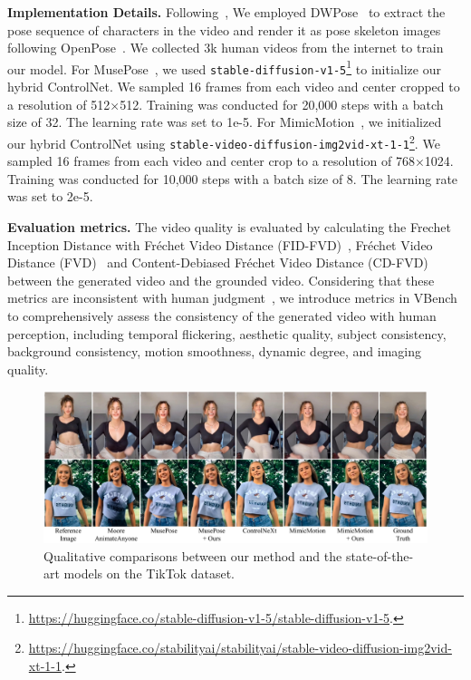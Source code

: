 \textbf{Implementation Details.} Following~\citep{hu2023animate,zhang2024mimicmotion}, We employed DWPose~\citep{yang2023dwpose} to extract the pose sequence of characters in the video and render it as pose skeleton images following OpenPose~\citep{cao2017openpose}. We collected 3k human videos from the internet to train our model. For MusePose~\citep{musepose}, we used \texttt{stable-diffusion-v1-5}\footnote{\hyperlink{https://huggingface.co/stable-diffusion-v1-5/stable-diffusion-v1-5}{https://huggingface.co/stable-diffusion-v1-5/stable-diffusion-v1-5}.} to initialize our hybrid ControlNet. We sampled 16 frames from each video and center cropped to a resolution of 512×512. Training was conducted for 20,000 steps with a batch size of 32. The learning rate was set to 1e-5. For MimicMotion~\citep{zhang2024mimicmotion}, we initialized our hybrid ControlNet using \texttt{stable-video-diffusion-img2vid-xt-1-1}\footnote{\hyperlink{https://huggingface.co/stabilityai/stabilityai/stable-video-diffusion-img2vid-xt-1-1}{https://huggingface.co/stabilityai/stabilityai/stable-video-diffusion-img2vid-xt-1-1}.}. We sampled 16 frames from each video and center crop to a resolution of 768×1024. Training was conducted for 10,000 steps with a batch size of 8. The learning rate was set to 2e-5.

\textbf{Evaluation metrics.} The video quality is evaluated by calculating {the Frechet Inception Distance with Fréchet Video Distance (FID-FVD)~\citep{balaji2019fid-fvd}, Fréchet Video Distance (FVD)~\citep{unterthiner2018fvd} and Content-Debiased Fréchet Video Distance (CD-FVD)~\citep{ge2024content}}
between the generated video and the grounded video. Considering that these metrics are inconsistent with human judgment~\citep{huang2024vbench}, we introduce metrics in VBench~\citep{huang2024vbench} to comprehensively assess the consistency of the generated video with human perception, including temporal flickering, aesthetic quality, subject consistency, background consistency, motion smoothness, dynamic degree, and imaging quality.

\begin{figure}[t]
    \centering
    \includegraphics[width=1.0\columnwidth]{./image/exp2.pdf}
    \vspace{-20pt}
    \caption{Qualitative comparisons between our method and the state-of-the-art models on the TikTok dataset.}
    \label{fig: vis tiktok}
\end{figure}

